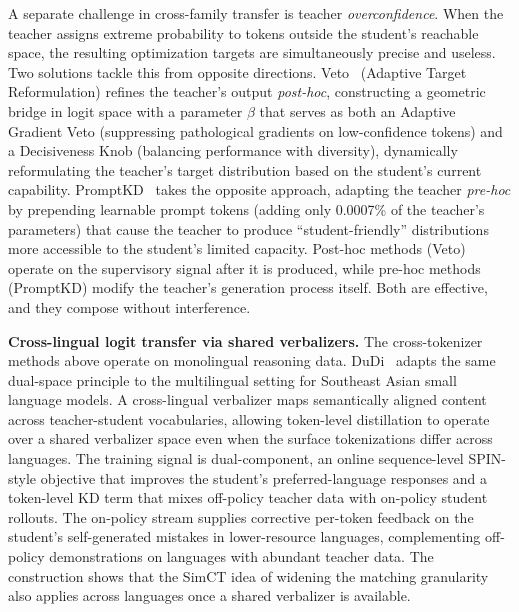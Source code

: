 \documentclass{article} %
\begin{document}
A separate challenge in cross-family transfer is teacher \emph{overconfidence}. When the teacher assigns extreme probability to tokens outside the student's reachable space, the resulting optimization targets are simultaneously precise and useless. Two solutions tackle this from opposite directions. Veto~\citep{2601.07155} (Adaptive Target Reformulation) refines the teacher's output \emph{post-hoc}, constructing a geometric bridge in logit space with a parameter $\beta$ that serves as both an Adaptive Gradient Veto (suppressing pathological gradients on low-confidence tokens) and a Decisiveness Knob (balancing performance with diversity), dynamically reformulating the teacher's target distribution based on the student's current capability. PromptKD~\citep{2402.12842} takes the opposite approach, adapting the teacher \emph{pre-hoc} by prepending learnable prompt tokens (adding only 0.0007\% of the teacher's parameters) that cause the teacher to produce ``student-friendly'' distributions more accessible to the student's limited capacity. Post-hoc methods (Veto) operate on the supervisory signal after it is produced, while pre-hoc methods (PromptKD) modify the teacher's generation process itself. Both are effective, and they compose without interference.

\textbf{Cross-lingual logit transfer via shared verbalizers.} The cross-tokenizer methods above operate on monolingual reasoning data. DuDi~\citep{2606.04694} adapts the same dual-space principle to the multilingual setting for Southeast Asian small language models. A cross-lingual verbalizer maps semantically aligned content across teacher-student vocabularies, allowing token-level distillation to operate over a shared verbalizer space even when the surface tokenizations differ across languages. The training signal is dual-component, an online sequence-level SPIN-style objective that improves the student's preferred-language responses and a token-level KD term that mixes off-policy teacher data with on-policy student rollouts. The on-policy stream supplies corrective per-token feedback on the student's self-generated mistakes in lower-resource languages, complementing off-policy demonstrations on languages with abundant teacher data. The construction shows that the SimCT idea of widening the matching granularity also applies across languages once a shared verbalizer is available.
\end{document}
